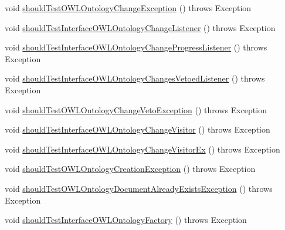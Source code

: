 \begin{DoxyCompactItemize}
\item 
void \hyperlink{classorg_1_1semanticweb_1_1owlapi_1_1contract_1_1_contract_owlapi_model__3_test_ac8f8d0b2a5226368529d3320b5818889}{should\-Test\-O\-W\-L\-Ontology\-Change\-Exception} ()  throws Exception 
\item 
void \hyperlink{classorg_1_1semanticweb_1_1owlapi_1_1contract_1_1_contract_owlapi_model__3_test_a46138512098215bf606d107213a11855}{should\-Test\-Interface\-O\-W\-L\-Ontology\-Change\-Listener} ()  throws Exception 
\item 
void \hyperlink{classorg_1_1semanticweb_1_1owlapi_1_1contract_1_1_contract_owlapi_model__3_test_aa2bd0af8235a2e39fbcd4c53c123cf50}{should\-Test\-Interface\-O\-W\-L\-Ontology\-Change\-Progress\-Listener} ()  throws Exception 
\item 
void \hyperlink{classorg_1_1semanticweb_1_1owlapi_1_1contract_1_1_contract_owlapi_model__3_test_a9571c7df90463dbe378fee9b60e87d2d}{should\-Test\-Interface\-O\-W\-L\-Ontology\-Changes\-Vetoed\-Listener} ()  throws Exception 
\item 
void \hyperlink{classorg_1_1semanticweb_1_1owlapi_1_1contract_1_1_contract_owlapi_model__3_test_a9f5e40b084e1618fd0e0f93f490bbd90}{should\-Test\-O\-W\-L\-Ontology\-Change\-Veto\-Exception} ()  throws Exception 
\item 
void \hyperlink{classorg_1_1semanticweb_1_1owlapi_1_1contract_1_1_contract_owlapi_model__3_test_ac4db9f561c94d06d0788121c99d45df5}{should\-Test\-Interface\-O\-W\-L\-Ontology\-Change\-Visitor} ()  throws Exception 
\item 
void \hyperlink{classorg_1_1semanticweb_1_1owlapi_1_1contract_1_1_contract_owlapi_model__3_test_a025380478906ee1a81df6e9409909ffb}{should\-Test\-Interface\-O\-W\-L\-Ontology\-Change\-Visitor\-Ex} ()  throws Exception 
\item 
void \hyperlink{classorg_1_1semanticweb_1_1owlapi_1_1contract_1_1_contract_owlapi_model__3_test_a67326690415c10c03673d61ae5c72544}{should\-Test\-O\-W\-L\-Ontology\-Creation\-Exception} ()  throws Exception 
\item 
void \hyperlink{classorg_1_1semanticweb_1_1owlapi_1_1contract_1_1_contract_owlapi_model__3_test_af501c7f2b26e90a886af0a26ffdc3caa}{should\-Test\-O\-W\-L\-Ontology\-Document\-Already\-Exists\-Exception} ()  throws Exception 
\item 
void \hyperlink{classorg_1_1semanticweb_1_1owlapi_1_1contract_1_1_contract_owlapi_model__3_test_a6e593c2ff3140c0606cfa139df2dbf3a}{should\-Test\-Interface\-O\-W\-L\-Ontology\-Factory} ()  throws Exception 

\end{DoxyCompactItemize}
